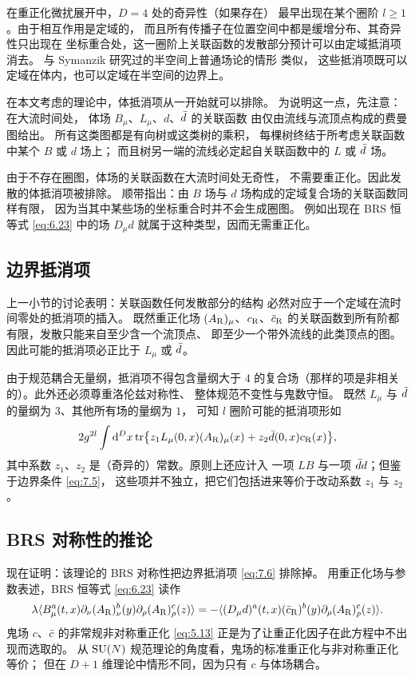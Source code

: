 在重正化微扰展开中，$D=4$ 处的奇异性（如果存在）
最早出现在某个圈阶 $l\geq1$。由于相互作用是定域的，
而且所有传播子在位置空间中都是缓增分布、其奇异性只出现在
坐标重合处，这一圈阶上关联函数的发散部分预计可以由定域抵消项消去。
与 Symanzik 研究过的半空间上普通场论的情形 \cite{Symanzik} 类似，
这些抵消项既可以定域在体内，也可以定域在半空间的边界上。

在本文考虑的理论中，体抵消项从一开始就可以排除。
为说明这一点，先注意：在大流时间处，
体场 $B_{\mu}$、$L_{\mu}$、$d$、$\bar{d}$ 的关联函数
由仅由流线与流顶点构成的费曼图给出。
所有这类图都是有向树或这类树的乘积，
每棵树终结于所考虑关联函数中某个 $B$ 或 $d$ 场上；
而且树另一端的流线必定起自关联函数中的 $L$ 或 $\bar{d}$ 场。

由于不存在圈图，体场的关联函数在大流时间处无奇性，
不需要重正化。因此发散的体抵消项被排除。
顺带指出：由 $B$ 场与 $d$ 场构成的定域复合场的关联函数同样有限，
因为当其中某些场的坐标重合时并不会生成圈图。
例如出现在 BRS 恒等式 \eqref{eq:6.23} 中的场 $D_{\mu}d$
就属于这种类型，因而无需重正化。

\subsection{边界抵消项}

上一小节的讨论表明：关联函数任何发散部分的结构
必然对应于一个定域在流时间零处的抵消项的插入。
既然重正化场 $(A_{\mathrm{R}})_{\mu}$、$c_{\mathrm{R}}$、$\bar{c}_{\mathrm{R}}$
的关联函数到所有阶都有限，发散只能来自至少含一个流顶点、
即至少一个带外流线的此类顶点的图。
因此可能的抵消项必正比于 $L_{\mu}$ 或 $\bar{d}$。

由于规范耦合无量纲，抵消项不得包含量纲大于 $4$
的复合场（那样的项是非相关的）。此外还必须尊重洛伦兹对称性、
整体规范不变性与鬼数守恒。
既然 $L_{\mu}$ 与 $\bar{d}$ 的量纲为 $3$、其他所有场的量纲为 $1$，
可知 $l$ 圈阶可能的抵消项形如
\begin{equation}
   2g^{2l}\int\mathrm{d}^Dx\,\mathrm{tr}\bigl\{
   z_1L_{\mu}(0,x)(A_{\mathrm{R}})_{\mu}(x)+
   z_2\bar{d}(0,x)c_{\mathrm{R}}(x)\bigr\},
   \label{eq:7.6}
\end{equation}
其中系数 $z_1$、$z_2$ 是（奇异的）常数。原则上还应计入
一项 $LB$ 与一项 $\bar{d} d$；但鉴于边界条件 \eqref{eq:7.5}，
这些项并不独立，把它们包括进来等价于改动系数 $z_1$ 与 $z_2$。

\subsection{BRS 对称性的推论}

现在证明：该理论的 BRS 对称性把边界抵消项 \eqref{eq:7.6} 排除掉。
用重正化场与参数表述，BRS 恒等式 \eqref{eq:6.23} 读作
\begin{equation}
   \lambda\langle
   B^a_{\mu}(t,x)\partial_{\nu}(A_{\mathrm{R}})^b_{\nu}(y)
   \partial_{\rho}(A_{\mathrm{R}})^c_{\rho}(z)
   \rangle=
   -\langle(D_{\mu}d)^a(t,x)
   (\bar{c}_{\mathrm{R}})^b(y)\partial_{\rho}(A_{\mathrm{R}})^c_{\rho}(z)\rangle.
   \label{eq:7.7}
\end{equation}
鬼场 $c$、$\bar{c}$ 的非常规非对称重正化 \eqref{eq:5.13}
正是为了让重正化因子在此方程中不出现而选取的。
从 $\mathrm{SU}(N)$ 规范理论的角度看，鬼场的标准重正化与非对称重正化等价；
但在 $D+1$ 维理论中情形不同，因为只有 $c$ 与体场耦合。

